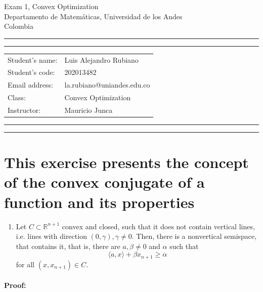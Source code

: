 \documentclass[10pt]{article}
\makeatletter
\newcommand{\studentname}{Luis Alejandro Rubiano}
\newcommand{\studentnumber}{202013482}
\newcommand{\researchcentre}{la.rubiano@uniandes.edu.co}
\newcommand{\projecttitle}{Convex Optimization}
\newcommand{\supervisor}{Mauricio Junca}
\makeatother
\begin{document}
\begin{center}
{\Huge{Exam 1, Convex Optimization}} \\
\vspace{2mm}
{\Large{Departamento de Matemáticas, Universidad de los Andes}} \\
\vspace{1mm}
{\Large{Colombia}}
\end{center}

\vspace{5mm}
\hrule
\vspace{1mm}
\hrule

\vspace{3mm}
\begin{tabular}{ll} 
Student's name:           	        & {\studentname}   \\ 
Student's code: 	        & {\studentnumber} \\ 
Email address: 	        & {\researchcentre}  \\ 
Class: 	& {\projecttitle}  \\ 
Instructor: 	    & {\supervisor}  \\ 
\end{tabular}

\vspace{3mm}
\hrule
\vspace{1mm}
\hrule

\hfill \break %

\iffalse

\section{This exercise presents the concept of the convex conjugate of a function and its properties}

\begin{enumerate}[label=\alph*)]
  \item Let $C \subset \mathbb{R}^{n+1}$ convex and closed, such that it does not contain vertical lines, i.e. lines with direction $(0, \gamma), \gamma \neq 0$. Then, there is a nonvertical semispace, that contains it, that is, there are $a, \beta \neq 0$ and $\alpha$ such that $$ \langle a, x \rangle + \beta x_{n+1} \geq \alpha$$ for all $(x, x_{n+1}) \in C$.
\end{enumerate}

\paragraph{Proof:}
\end{document}
